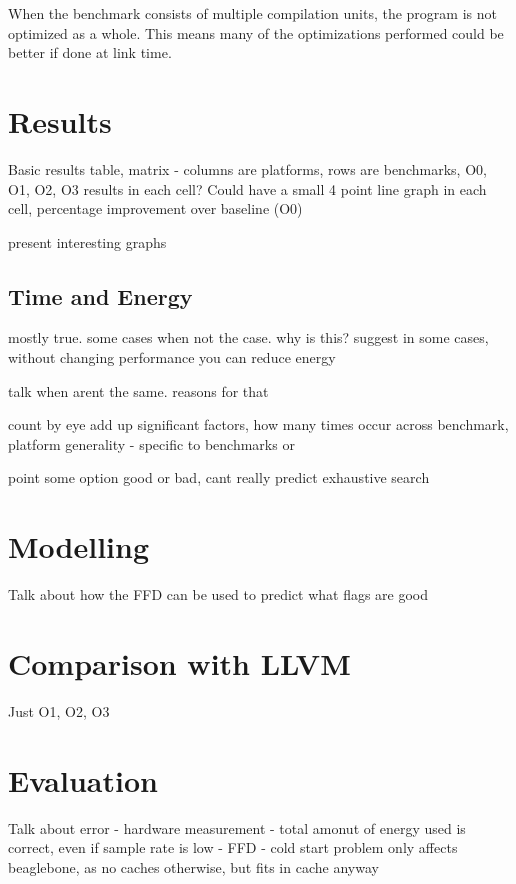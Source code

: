 \documentclass[twocolumn]{article}
\begin{document}
When the benchmark consists of multiple compilation units, the program is not optimized as a whole. This means many of the optimizations performed could be better if done at link time.

\section*{Results}

Basic results table, matrix - columns are platforms, rows are benchmarks, O0, O1, O2, O3 results in each cell?
Could have a small 4 point line graph in each cell, percentage improvement over baseline (O0)

present interesting graphs

\subsection*{Time and Energy}

mostly true.
some cases when not the case. why is this?
suggest in some cases, without changing performance you can reduce energy

talk when arent the same.
reasons for that


count
by eye add up significant factors, how many times occur across benchmark, platform
generality - specific to benchmarks or

point some option good or bad, cant really predict
exhaustive search

\section*{Modelling}

Talk about how the FFD can be used to predict what flags are good

\section*{Comparison with LLVM}

Just O1, O2, O3


\section*{Evaluation}

Talk about error
 - hardware measurement
 - total amonut of energy used is correct, even if sample rate is low
 - FFD
 - cold start problem
 	only affects beaglebone, as no caches otherwise, but fits in cache anyway
\end{document}
